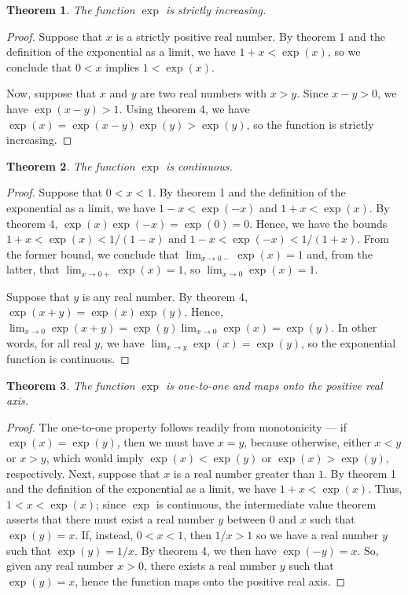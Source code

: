 \documentclass[12pt]{article}
\newtheorem{thm}{Theorem}
\begin{document}
\begin{thm}
The function $\exp$ is strictly increasing.
\end{thm}

\begin{proof}
Suppose that $x$ is a strictly positive real number.  By theorem 1 and 
the definition of the exponential as a limit, we have $1 + x < \exp (x)$,
so we conclude that $0 < x$ implies $1 < \exp (x)$.

Now, suppose that $x$ and $y$ are two real numbers with $x > y$.  Since
$x - y > 0$, we have $\exp (x-y) > 1$.  Using theorem 4, we have $\exp (x) 
= \exp (x-y) \exp (y) > \exp (y)$, so the function is strictly increasing.
\end{proof}

\begin{thm}
 The function $\exp$ is continuous.
\end{thm}

\begin{proof}
Suppose that $0 < x < 1$.  By theorem 1 and the definition of the exponential 
as a limit, we have $1 - x < \exp (-x)$ and $1 + x < \exp (x)$.  By theorem 4,
$\exp (x) \exp (-x) = \exp (0) = 0$.  Hence, we have the bounds $1 + x < \exp (x)
< 1/(1-x)$ and $1-x < \exp (-x) < 1/(1+x)$.  From the former bound, we conclude
that $\lim_{x \to 0-} \exp (x) = 1$ and, from the latter, that $\lim_{x \to 0+} 
\exp (x) = 1$, so $\lim_{x \to 0} \exp (x) = 1$.

Suppose that $y$ is any real number.  By theorem 4, $\exp (x + y) = \exp (x)
\exp (y)$.  Hence, $\lim_{x \to 0} \exp (x + y) = \exp (y) \lim_{x \to 0}
\exp (x) = \exp (y)$.  In other words, for all real $y$, we have $\lim_{ x
\to y} \exp (x) = \exp (y)$, so the exponential function is continuous.
\end{proof}

\begin{thm}
 The function $\exp$ is one-to-one and maps onto the positive real axis.
\end{thm}

\begin{proof}
The one-to-one property follows readily from monotonicity --- if $\exp (x) =
\exp (y)$, then we must have $x = y$, because otherwise, either $x < y$ or
$x > y$, which would imply $\exp (x) < \exp (y)$ or $\exp (x) > \exp (y)$,
respectively.  Next, suppose that $x$ is a real number greater than $1$.  
By theorem 1 and the definition of the exponential as a limit, we have 
$1 + x < \exp (x)$.  Thus, $1 < x < \exp (x)$; since $\exp$ is continuous,
the intermediate value theorem asserts that there must exist a real
number $y$ between $0$ and $x$ such that $\exp (y) = x$.  If, instead,
$0 < x < 1$, then $1/x > 1$ so we have a real number $y$ such that $\exp (y)
= 1/x$.  By theorem 4, we then have $\exp (-y) = x$.  So, given any real 
number $x > 0$, there exists a real number $y$ such that $\exp (y) = x$, 
hence the function maps onto the positive real axis.
\end{proof}
\end{document}
